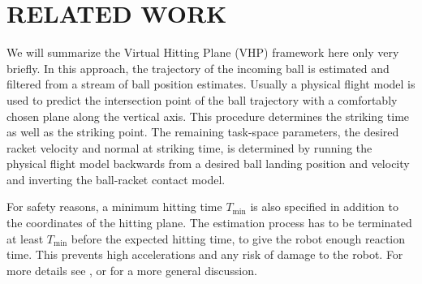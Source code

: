 \section{RELATED WORK}\label{relatedWork}

We will summarize the Virtual Hitting Plane (VHP) framework here only very briefly. In this approach, the trajectory of the incoming ball is estimated and filtered from a stream of ball position estimates. Usually a physical flight model is used to predict the intersection point of the ball trajectory with a comfortably chosen plane along the vertical axis. This procedure determines the striking time as well as the striking point. The remaining task-space parameters, the desired racket velocity and normal at striking time, is determined by running the physical flight model backwards from a desired ball landing position and velocity and inverting the ball-racket contact model.

For safety reasons, a minimum hitting time $T_{\mathrm{min}}$ is also specified in addition to the coordinates of the hitting plane. The estimation process has to be terminated at least $T_{\mathrm{min}}$ before the expected hitting time, to give the robot enough reaction time. This prevents high accelerations and any risk of damage to the robot. For more details see \cite{Muelling13}, or \cite{Matsushima05} for a more general discussion. 


